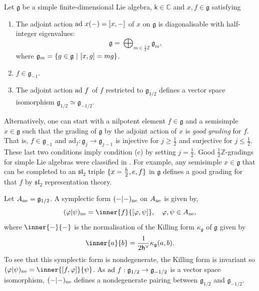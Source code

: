 \documentclass[10pt,a4paper]{amsart}
\numberwithin{equation}{section}
\renewcommand{\cong}{\simeq} %
\newcommand{\kk}{\mathsf{k}}   %
\DeclarePairedDelimiter{\set}{\lbrace}{\rbrace}
\newcommand{\blank}{{-}}
\newcommand{\fld}[1]{\mathbb{#1}}    %
\newcommand{\alg}[1]{\mathfrak{#1}}  %
\newcommand{\ZZ}{\fld{Z}}
\newcommand{\CC}{\fld{C}}
\newcommand{\SLA}[2]{\alg{#1}_{#2}}                      %
\newcommand{\sltwo}{\SLA{sl}{2}}
\newcommand{\cox}{\mathsf{h}}                                        %
\newcommand{\dcox}{\coroot{\cox}}                                    %
\newcommand{\coroot}[1]{#1^{\vee}}                                   %
\theoremstyle{plain}
\begin{document}
Let $\mathfrak{g}$ be a simple finite-dimensional Lie algebra, $\kk \in \CC$ and $x,f \in \mathfrak{g}$ satisfying
%
\begin{enumerate}
    \item The adjoint action $\textup{ad }x (\blank) = [x, \blank]$ of $x$ on $\mathfrak{g}$ is diagonalisable with half-integer eigenvalues:
    \begin{equation}
        \mathfrak{g} = \bigoplus_{m \in \frac{1}{2}\ZZ} \mathfrak{g}_m,
    \end{equation}
    where $\mathfrak{g}_m = \set{g \in \mathfrak{g} \ | \ [x,g] = m g}$.
    \item $f \in \mathfrak{g}_{-1}$.
    \item The adjoint action $\textup{ad }f$ of $f$ restricted to $\mathfrak{g}_{1/2}$ defines a vector space isomorphism $\mathfrak{g}_{1/2} \cong \mathfrak{g}_{-1/2}$.
\end{enumerate}
%
Alternatively, one can start with a nilpotent element $f \in \mathfrak{g}$ and a semisimple $x \in \mathfrak{g}$ such that the grading of $\mathfrak{g}$ by the adjoint action of $x$ is \emph{good grading} for $f$. That is, $f \in \mathfrak{g}_{-1}$ and $\text{ad}_f:\mathfrak{g}_j \rightarrow \mathfrak{g}_{j-1}$ is injective for $j \geq \frac{1}{2}$ and surjective for $j \leq  \frac{1}{2}$. These last two conditions imply condition (c) by setting $j=\frac{1}{2}$. Good $\frac{1}{2}\ZZ$-gradings for simple Lie algebras were classified in \cite{ElasClass05}. For example, any semisimple $x \in \mathfrak{g}$ that can be completed to an $\sltwo$ triple $\set{x=\frac{h}{2},e,f}$ in $\mathfrak{g}$ defines a good grading for that $f$ by $\sltwo$ representation theory. 

Let $A_{\textup{ne}} = \mathfrak{g}_{1/2}$. A symplectic form $(\blank | \blank)_{\textup{ne}}$ on $A_{\textup{ne}}$ is given by,
%
\begin{equation}
    (\varphi| \psi)_{\textup{ne}} = \inner{f}{[\varphi,\psi]}, \quad \varphi,\psi \in A_{\textup{ne}},
\end{equation}
%
where $\inner{\blank}{\blank}$ is the normalisation of the Killing form $\kappa_{\mathfrak{g}}$ of $\mathfrak{g}$ given by
%
\begin{equation}
   \inner{a}{b}=\frac{1}{2\dcox}\kappa_{\mathfrak{g}}(a,b).
\end{equation}
%
To see that this symplectic form is nondegenerate, the Killing form is invariant so $(\varphi| \psi)_{\textup{ne}} = \inner{[f,\varphi]}{\psi}$. As $\textup{ad }f:\mathfrak{g}_{1/2} \rightarrow \mathfrak{g}_{-1/2}$ is a vector space isomorphism, $(\blank | \blank)_{\textup{ne}}$ defines a nondegenerate pairing between $\mathfrak{g}_{1/2}$ and $\mathfrak{g}_{-1/2}$. 
\end{document}

